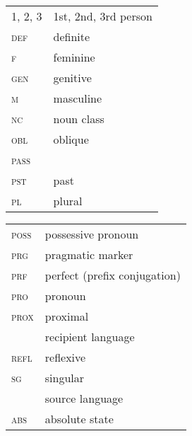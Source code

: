 \documentclass[output=paper]{langsci/langscibook}
\begin{document}
\begin{tabularx}{.5\textwidth}{@{}lQ@{}}
\textsc{1, 2, 3} & 1st, 2nd, 3rd person \\
\textsc{def} & {definite}  \\
\textsc{f} & feminine \\
\textsc{gen} & genitive \\
\textsc{m} & masculine \\
\textsc{nc} & noun class  \\
\textsc{obl} & oblique \\
\textsc{pass} &  \\
\textsc{pst} & past \\
\textsc{pl} & plural \\
\end{tabularx}%
\begin{tabularx}{.5\textwidth}{@{}lQ@{}}
\textsc{poss} & possessive pronoun \\
\textsc{prg} & pragmatic marker \\
\textsc{prf} & perfect (prefix conjugation) \\
\textsc{pro} & pronoun \\
\textsc{prox} & proximal \\
 & {recipient language} \\
\textsc{refl} & reflexive \\
\textsc{sg} & singular \\
 & {source language} \\
\textsc{abs} & absolute state \\
\end{tabularx}%

{\sloppy\printbibliography[heading=subbibliography,notkeyword=this]}
\end{document}
